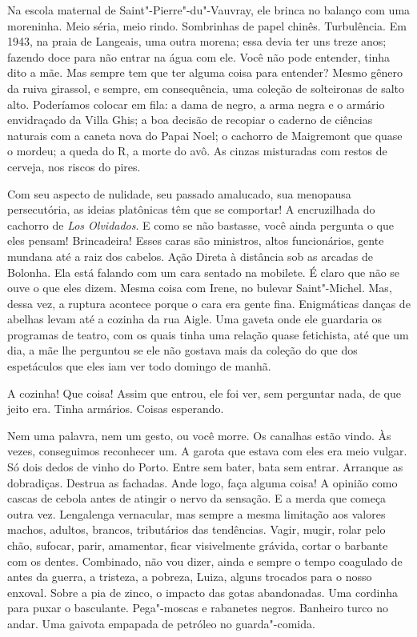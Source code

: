 Na escola maternal de Saint"-Pierre"-du"-Vauvray, ele brinca no balanço com
uma moreninha. Meio séria, meio rindo. Sombrinhas de papel chinês.
Turbulência. Em 1943, na praia de Langeais, uma outra morena; essa devia
ter uns treze anos; fazendo doce para não entrar na água com ele. Você
não pode entender, tinha dito a mãe. Mas sempre tem que ter alguma coisa
para entender? Mesmo gênero da ruiva girassol, e sempre, em
consequência, uma coleção de solteironas de salto alto. Poderíamos
colocar em fila: a dama de negro, a arma negra e o armário envidraçado
da Villa Ghis; a boa decisão de recopiar o caderno de ciências naturais
com a caneta nova do Papai Noel; o cachorro de Maigremont que quase o
mordeu; a queda do R, a morte do avô. As cinzas misturadas com restos de
cerveja, nos riscos do pires.

Com seu aspecto de nulidade, seu passado amalucado, sua menopausa
persecutória, as ideias platônicas têm que se comportar! A encruzilhada
do cachorro de \emph{Los Olvidados}. E como se não bastasse, você ainda
pergunta o que eles pensam! Brincadeira! Esses caras são ministros,
altos funcionários, gente mundana até a raiz dos cabelos. Ação Direta à
distância sob as arcadas de Bolonha. Ela está falando com um cara
sentado na mobilete. É claro que não se ouve o que eles dizem. Mesma
coisa com Irene, no bulevar Saint"-Michel. Mas, dessa vez, a ruptura
acontece porque o cara era gente fina. Enigmáticas danças de abelhas
levam até a cozinha da rua Aigle. Uma gaveta onde ele guardaria os
programas de teatro, com os quais tinha uma relação quase fetichista,
até que um dia, a mãe lhe perguntou se ele não gostava mais da coleção
do que dos espetáculos que eles iam ver todo domingo de manhã.

A cozinha! Que coisa! Assim que entrou, ele foi ver, sem perguntar nada,
de que jeito era. Tinha armários. Coisas esperando.

Nem uma palavra, nem um gesto, ou você morre. Os canalhas estão vindo.
Às vezes, conseguimos reconhecer um. A garota que estava com eles era
meio vulgar. Só dois dedos de vinho do Porto. Entre sem bater, bata sem
entrar. Arranque as dobradiças. Destrua as fachadas. Ande logo, faça
alguma coisa! A opinião como cascas de cebola antes de atingir o nervo
da sensação. E a merda que começa outra vez. Lengalenga vernacular, mas
sempre a mesma limitação aos valores machos, adultos, brancos,
tributários das tendências. Vagir, mugir, rolar pelo chão, sufocar,
parir, amamentar, ficar visivelmente grávida, cortar o barbante com os
dentes. Combinado, não vou dizer, ainda e sempre o tempo coagulado de
antes da guerra, a tristeza, a pobreza, Luiza, alguns trocados para o
nosso enxoval. Sobre a pia de zinco, o impacto das gotas abandonadas.
Uma cordinha para puxar o basculante. Pega"-moscas e rabanetes negros.
Banheiro turco no andar. Uma gaivota empapada de petróleo no
guarda"-comida.

